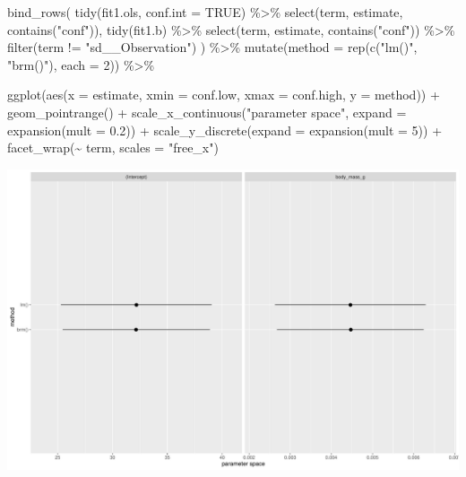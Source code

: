 \documentclass[
  letterpaper,
  DIV=11,
  numbers=noendperiod]{scrartcl}
\newenvironment{Shaded}{\begin{snugshade}}{\end{snugshade}}
\newcommand{\AttributeTok}[1]{\textcolor[rgb]{0.40,0.45,0.13}{#1}}
\newcommand{\ConstantTok}[1]{\textcolor[rgb]{0.56,0.35,0.01}{#1}}
\newcommand{\DecValTok}[1]{\textcolor[rgb]{0.68,0.00,0.00}{#1}}
\newcommand{\FloatTok}[1]{\textcolor[rgb]{0.68,0.00,0.00}{#1}}
\newcommand{\FunctionTok}[1]{\textcolor[rgb]{0.28,0.35,0.67}{#1}}
\newcommand{\NormalTok}[1]{\textcolor[rgb]{0.00,0.23,0.31}{#1}}
\newcommand{\SpecialCharTok}[1]{\textcolor[rgb]{0.37,0.37,0.37}{#1}}
\newcommand{\StringTok}[1]{\textcolor[rgb]{0.13,0.47,0.30}{#1}}
\begin{document}
\begin{Shaded}
\begin{Highlighting}[]
\FunctionTok{bind\_rows}\NormalTok{(}
  \FunctionTok{tidy}\NormalTok{(fit1.ols, }\AttributeTok{conf.int =} \ConstantTok{TRUE}\NormalTok{) }\SpecialCharTok{\%\textgreater{}\%} \FunctionTok{select}\NormalTok{(term, estimate, }\FunctionTok{contains}\NormalTok{(}\StringTok{"conf"}\NormalTok{)),}
  \FunctionTok{tidy}\NormalTok{(fit1.b) }\SpecialCharTok{\%\textgreater{}\%} \FunctionTok{select}\NormalTok{(term, estimate, }\FunctionTok{contains}\NormalTok{(}\StringTok{"conf"}\NormalTok{)) }\SpecialCharTok{\%\textgreater{}\%} \FunctionTok{filter}\NormalTok{(term }\SpecialCharTok{!=} \StringTok{"sd\_\_Observation"}\NormalTok{)}
\NormalTok{) }\SpecialCharTok{\%\textgreater{}\%} 
  \FunctionTok{mutate}\NormalTok{(}\AttributeTok{method =} \FunctionTok{rep}\NormalTok{(}\FunctionTok{c}\NormalTok{(}\StringTok{"lm()"}\NormalTok{, }\StringTok{"brm()"}\NormalTok{), }\AttributeTok{each =} \DecValTok{2}\NormalTok{)) }\SpecialCharTok{\%\textgreater{}\%} 
  
  \FunctionTok{ggplot}\NormalTok{(}\FunctionTok{aes}\NormalTok{(}\AttributeTok{x =}\NormalTok{ estimate, }\AttributeTok{xmin =}\NormalTok{ conf.low, }\AttributeTok{xmax =}\NormalTok{ conf.high, }\AttributeTok{y =}\NormalTok{ method)) }\SpecialCharTok{+}
  \FunctionTok{geom\_pointrange}\NormalTok{() }\SpecialCharTok{+}
  \FunctionTok{scale\_x\_continuous}\NormalTok{(}\StringTok{"parameter space"}\NormalTok{, }\AttributeTok{expand =} \FunctionTok{expansion}\NormalTok{(}\AttributeTok{mult =} \FloatTok{0.2}\NormalTok{)) }\SpecialCharTok{+}
  \FunctionTok{scale\_y\_discrete}\NormalTok{(}\AttributeTok{expand =} \FunctionTok{expansion}\NormalTok{(}\AttributeTok{mult =} \DecValTok{5}\NormalTok{)) }\SpecialCharTok{+}
  \FunctionTok{facet\_wrap}\NormalTok{(}\SpecialCharTok{\textasciitilde{}}\NormalTok{ term, }\AttributeTok{scales =} \StringTok{"free\_x"}\NormalTok{)}
\end{Highlighting}
\end{Shaded}

\includegraphics{Bayes_Lab_1_files/figure-pdf/unnamed-chunk-26-1.pdf}
\end{document}
